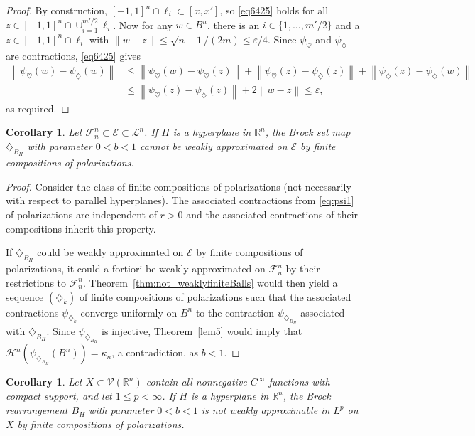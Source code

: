 \documentclass[12pt,reqno]{amsart}
\newcommand{\ee}{\varepsilon}
\newcommand{\R}{{\mathbb R}}
\newcommand{\cH}{{\mathcal H}}
\newcommand{\cL}{\mathcal L}
\newcommand{\cF}{\mathcal F}
\newcommand{\cE}{{\mathcal E}}
\newcommand{\cV}{{\mathcal V}}
\newtheorem{cor}[thm]{Corollary}
\newcommand{\di}{\diamondsuit}
\numberwithin{equation}{section}
\begin{document}
\begin{proof}
By construction, $[-1,1]^n\cap \ell_i\subset [x, x']$, so \eqref{eq6425} holds for all $z\in [-1,1]^n\cap \cup_{i=1}^{m'/2}\ell_i$. Now for any $w\in B^n$, there is an $i\in\{1,\dots,m'/2\}$ and a $z\in [-1,1]^n\cap\ell_i$ with $\|w-z\|\le \sqrt{n-1}/(2m)\le \ee/4$.  Since $\psi_{\heartsuit}$ and $\psi_\di$ are contractions, \eqref{eq6425} gives
\begin{align*}
\left\|	\psi_{\heartsuit}(w)-\psi_\di (w)\right\|
&\le \left\|\psi_{\heartsuit}(w)-\psi_{\heartsuit} (z)\right\|
+\left\|\psi_{\heartsuit} (z)-\psi_{\di}(z)\right\|+
\left\|\psi_{\di}(z)-\psi_\di (w)\right\|\\
&\le \left\|\psi_{\heartsuit}(z)-\psi_\di (z)\right\|
+2\left\|w-z\right\|\le \ee,
\end{align*}
as required.
\end{proof}

\begin{cor}\label{corBrockWeak}
Let $\cF_n^n\subset \cE\subset \cL^n$. If $H$ is a hyperplane in $\R^n$, the Brock set map $\di_{B_H}$ with parameter $0<b<1$ cannot be weakly approximated on $\cE$ by finite compositions of polarizations.
\end{cor}

\begin{proof}
Consider the class of finite compositions of polarizations (not necessarily with respect to parallel hyperplanes). The associated contractions from \eqref{eq:psi1} of polarizations are independent of $r>0$ and the associated contractions of their compositions inherit this property.

If $\di_{B_H}$ could be weakly approximated on $\cE$ by finite compositions of polarizations, it could a fortiori be weakly approximated on $\cF_n^n$ by their restrictions to $\cF_n^n$. Theorem~\ref{thm:not_weaklyfiniteBalls} would then yield a sequence $(\di_k)$ of finite compositions of polarizations such that the associated contractions $\psi_{\di_k}$ converge uniformly on $B^n$ to the contraction $\psi_{\di_{B_H}}$ associated with $\di_{B_H}$. Since  $\psi_{\di_{B_H}}$ is injective, Theorem~\ref{lem5} would imply that ${\cH}^n(\psi_{\di_{B_H}}(B^n))=\kappa_n$, a contradiction, as $b<1$.
\end{proof}

\begin{cor}\label{corBrockWeakfunctions}
Let $X\subset \cV(\R^n)$ contain all nonnegative $C^{\infty}$ functions with compact support, and let $1\le p<\infty$. If $H$ is a hyperplane in $\R^n$, the Brock rearrangement $B_H$ with parameter $0<b<1$ is not weakly approximable in $L^p$ on $X$ by finite compositions of polarizations.
\end{cor}
\end{document}

